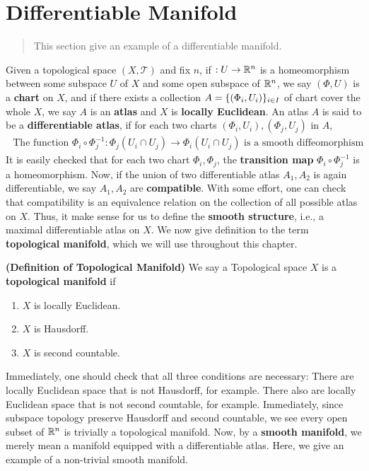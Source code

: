 \documentclass{report}
\begin{document}
\section{Differentiable Manifold}
\begin{abstract}
This section give an example of a differentiable manifold.
\end{abstract}
\begin{mdframed}
Given a topological space $(X,\mathscr{T })$ and fix $n$, if $:U\rightarrow \mathbb{R}^n$ is a homeomorphism between some subspace $U$ of $X$ and some open subspace of $\mathbb{R}^n$, we say $(\Phi,U)$ is a \textbf{chart} on $X$, and if there exists a collection $A=\{ (\Phi_i, U_i) \}_{i \in I}$ of chart cover the whole $X$, we say $A$ is an  \textbf{atlas} and  $X$ is  \textbf{locally Euclidean}. An atlas $A$ is said to be a \textbf{differentiable atlas}, if for each two charts $(\Phi_i,U_i),(\Phi_j,U_j)$ in $A$, 
\begin{align*}
\text{ The function }\Phi_i\circ \Phi_j^{-1}:\Phi_j(U_i\cap U_j)\to \Phi_i(U_i\cap U_j)\text{ is a smooth diffeomorphism }
\end{align*}
It is easily checked that for each two chart $\Phi_i,\Phi_j$, the \textbf{transition map} $\Phi_i\circ \Phi_j^{-1}$ is a homeomorphism. Now, if the union of two differentiable atlas $A_1,A_2$ is again differentiable, we say $A_1,A_2$ are \textbf{compatible}. With some effort, one can check that compatibility is an equivalence relation on the collection of all possible atlas on $X$. Thus, it make sense for us to define the \textbf{smooth structure}, i.e., a maximal differentiable atlas on $X$. We now give definition to the term \textbf{topological manifold}, which we will use throughout this chapter.  
\end{mdframed}
\begin{definition}
\textbf{(Definition of Topological Manifold)} We say a Topological space $X$ is a \textbf{topological manifold} if 
\begin{enumerate}[label=(\alph*)]
  \item $X$ is locally Euclidean. 
  \item $X$ is Hausdorff. 
  \item $X$ is second countable.
\end{enumerate}
\end{definition}
\begin{mdframed}
Immediately, one should check that all three conditions are necessary: There are locally Euclidean space that is not Hausdorff,  for example. There also are locally Euclidean space that is not second countable,  for example. Immediately, since subspace topology preserve Hausdorff and second countable, we see every open subset of $\mathbb{R}^n$ is trivially a topological manifold. Now, by a \textbf{smooth manifold}, we merely mean a manifold equipped with a differentiable atlas. Here, we give an example of a non-trivial smooth manifold.  
\end{mdframed}
\end{document}
